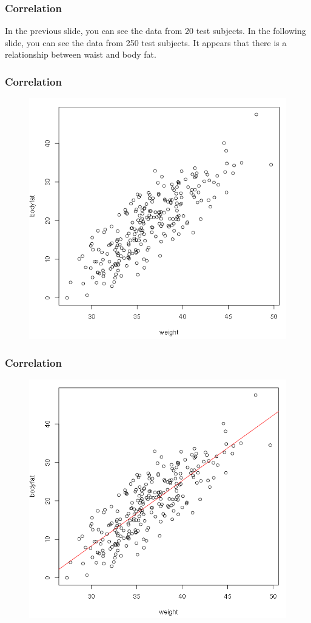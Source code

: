 \documentclass[xcolor=dvipsnames]{beamer}
\begin{document}
\begin{frame}
  \frametitle{Correlation}
  In the previous slide, you can see the data from 20 test subjects.
  In the following slide, you can see the data from 250 test subjects. It appears that there is a
  relationship between waist and body fat.
\end{frame}

\begin{frame}
  \frametitle{Correlation}
\begin{figure}[h]
\includegraphics[scale=.35]{./diagrams/bf-02.png}
\end{figure}
\end{frame}

\begin{frame}
  \frametitle{Correlation}
\begin{figure}[h]
\includegraphics[scale=.35]{./diagrams/bf-03.png}
\end{figure}
\end{frame}
\end{document}
